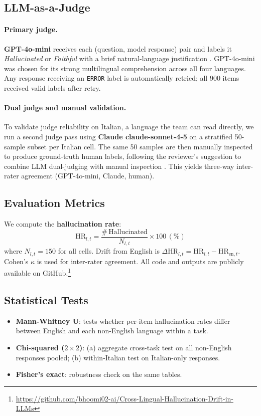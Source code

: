 \documentclass[11pt]{article}
\begin{document}
\subsection{LLM-as-a-Judge}

\paragraph{Primary judge.}
\textbf{GPT-4o-mini} receives each (question, model response) pair and labels
it \textit{Hallucinated} or \textit{Faithful} with a brief natural-language
justification \cite{kang-etal-2024-comparing}. GPT-4o-mini was chosen for its
strong multilingual comprehension across all four languages. Any response
receiving an \texttt{ERROR} label is automatically retried; all 900 items
received valid labels after retry.

\paragraph{Dual judge and manual validation.}
To validate judge reliability on Italian, a language the team can read
directly, we run a second judge pass using \textbf{Claude claude-sonnet-4-5} on a
stratified 50-sample subset per Italian cell. The same 50 samples are then
manually inspected to produce ground-truth human labels, following the
reviewer's suggestion to combine LLM dual-judging with manual inspection
\cite{kang-etal-2024-comparing}. This yields three-way inter-rater agreement
(GPT-4o-mini, Claude, human).

\subsection{Evaluation Metrics}

We compute the \textbf{hallucination rate}:
\[
\mathrm{HR}_{l,t} = \frac{\#\,\text{Hallucinated}}{N_{l,t}} \times 100\,(\%)
\]
where $N_{l,t}=150$ for all cells. Drift from English is
$\Delta\mathrm{HR}_{l,t} = \mathrm{HR}_{l,t} - \mathrm{HR}_{\mathrm{en},t}$.
Cohen's $\kappa$ is used for inter-rater agreement.
All code and outputs are publicly available on GitHub.\footnote{\url{https://github.com/bhoomi02-ai/Cross-Lingual-Hallucination-Drift-in-LLMs}}

\subsection{Statistical Tests}

\begin{itemize}
  \item \textbf{Mann-Whitney U}: tests whether per-item hallucination rates
        differ between English and each non-English language within a task.
  \item \textbf{Chi-squared ($2\times2$)}: (a) aggregate cross-task test on all
        non-English responses pooled; (b) within-Italian test on Italian-only
        responses.
  \item \textbf{Fisher's exact}: robustness check on the same tables.
\end{itemize}
\end{document}

